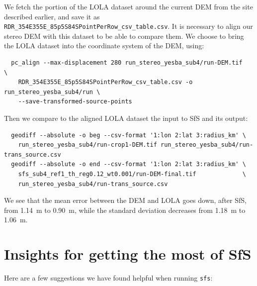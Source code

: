 We fetch the portion of the LOLA dataset around the current DEM from the
site described earlier, and save it as
\verb#RDR_354E355E_85p5S84SPointPerRow_csv_table.csv#. It is necessary
to align our stereo DEM with this dataset to be able to compare
them. We choose to bring the LOLA dataset into the coordinate system
of the DEM, using:
\begin{verbatim}
  pc_align --max-displacement 280 run_stereo_yesba_sub4/run-DEM.tif             \
    RDR_354E355E_85p5S84SPointPerRow_csv_table.csv -o run_stereo_yesba_sub4/run \
    --save-transformed-source-points
\end{verbatim}

Then we compare to the aligned LOLA dataset the input to SfS and its output:
\begin{verbatim}
  geodiff --absolute -o beg --csv-format '1:lon 2:lat 3:radius_km' \
    run_stereo_yesba_sub4/run-crop1-DEM.tif run_stereo_yesba_sub4/run-trans_source.csv
  geodiff --absolute -o end --csv-format '1:lon 2:lat 3:radius_km' \
    sfs_sub4_ref1_th_reg0.12_wt0.001/run-DEM-final.tif             \
    run_stereo_yesba_sub4/run-trans_source.csv
\end{verbatim}

We see that the mean error between the DEM and LOLA goes down, after SfS,
from  1.14~m to 0.90~m, while the standard deviation decreases from
 1.18~m to 1.06~m.

\section{Insights for getting the most of SfS}
\label{sfs:insights}

Here are a few suggestions we have found helpful when running \texttt{sfs}:

